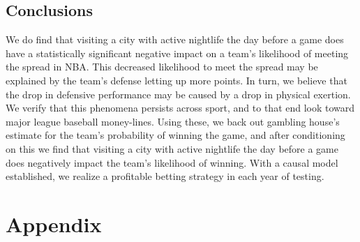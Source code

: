 \documentclass[letterpaper,12pt]{article}
\begin{document}
\subsection{Conclusions}
We do find that visiting a city with active nightlife the day before a game does have 
a statistically significant negative impact on a team's likelihood of meeting the spread in NBA. This decreased likelihood to meet the spread may be explained 
by the team's defense letting up more points. In turn, we believe that the drop in
defensive performance may be caused by a drop in physical exertion.
We verify that this phenomena persists across sport, and 
to that end look toward major league baseball money-lines. Using these, we back out gambling
house's estimate for the team's probability of winning the game, and after conditioning on this
we find that visiting a city with active nightlife the day before a game does negatively 
impact the team's likelihood of winning.
With a causal model established, we realize a profitable betting strategy in each year of testing.




\section{Appendix}
\end{document}

